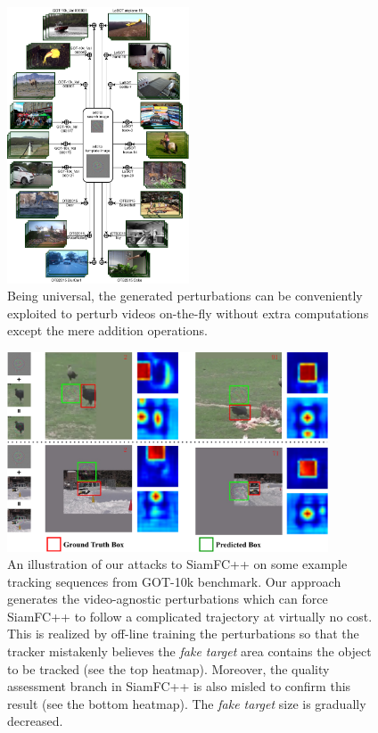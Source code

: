\documentclass[journal]{IEEEtran}
\begin{document}
\begin{figure}[t]
  \centering
  \includegraphics[width=0.48\textwidth]{images_imperceptible/UAP.pdf}
  \caption{Being universal, the generated perturbations can be conveniently exploited to perturb videos on-the-fly without extra computations except the mere addition operations.} 
  \label{fig:UAP}
\end{figure}

\begin{figure}[t]
  \centering
  \includegraphics[width=0.85\textwidth]{images_imperceptible/1_v8.pdf}
  \caption{An illustration of our attacks to SiamFC++ on some example tracking sequences from GOT-10k benchmark. Our approach generates the video-agnostic perturbations which can force SiamFC++ to follow a complicated trajectory at virtually no cost. This is realized by off-line training the perturbations so that the tracker mistakenly believes the \textit{fake target} area contains the object to be tracked (see the top heatmap). Moreover, the quality assessment branch in SiamFC++ is also misled to confirm this result (see the bottom heatmap). The \textit{fake target} size is gradually decreased.} 
  \label{fig:1}
\end{figure}
\end{document}
